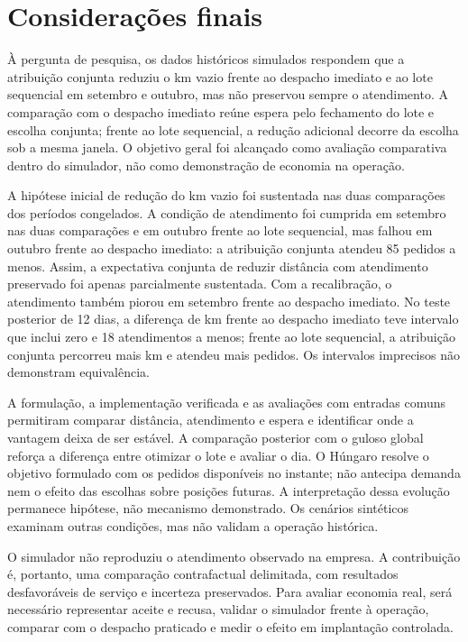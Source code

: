 \section{Considerações finais}

À pergunta de pesquisa, os dados históricos simulados respondem que a atribuição conjunta reduziu o km vazio frente ao despacho imediato e ao lote sequencial em setembro e outubro, mas não preservou sempre o atendimento. A comparação com o despacho imediato reúne espera pelo fechamento do lote e escolha conjunta; frente ao lote sequencial, a redução adicional decorre da escolha sob a mesma janela. O objetivo geral foi alcançado como avaliação comparativa dentro do simulador, não como demonstração de economia na operação.

A hipótese inicial de redução do km vazio foi sustentada nas duas comparações dos períodos congelados. A condição de atendimento foi cumprida em setembro nas duas comparações e em outubro frente ao lote sequencial, mas falhou em outubro frente ao despacho imediato: a atribuição conjunta atendeu 85 pedidos a menos. Assim, a expectativa conjunta de reduzir distância com atendimento preservado foi apenas parcialmente sustentada. Com a recalibração, o atendimento também piorou em setembro frente ao despacho imediato. No teste posterior de 12 dias, a diferença de km frente ao despacho imediato teve intervalo que inclui zero e 18 atendimentos a menos; frente ao lote sequencial, a atribuição conjunta percorreu mais km e atendeu mais pedidos. Os intervalos imprecisos não demonstram equivalência.

A formulação, a implementação verificada e as avaliações com entradas comuns permitiram comparar distância, atendimento e espera e identificar onde a vantagem deixa de ser estável. A comparação posterior com o guloso global reforça a diferença entre otimizar o lote e avaliar o dia. O Húngaro resolve o objetivo formulado com os pedidos disponíveis no instante; não antecipa demanda nem o efeito das escolhas sobre posições futuras. A interpretação dessa evolução permanece hipótese, não mecanismo demonstrado. Os cenários sintéticos examinam outras condições, mas não validam a operação histórica.

O simulador não reproduziu o atendimento observado na empresa. A contribuição é, portanto, uma comparação contrafactual delimitada, com resultados desfavoráveis de serviço e incerteza preservados. Para avaliar economia real, será necessário representar aceite e recusa, validar o simulador frente à operação, comparar com o despacho praticado e medir o efeito em implantação controlada.

